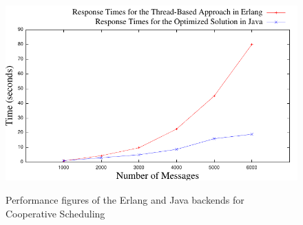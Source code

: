 \begin{figure}
	\caption{Performance figures of the Erlang and Java backends for Cooperative Scheduling}
	\centering
	\includegraphics[scale=0.8]{erlj8.pdf}
	\label{ej}
	
\end{figure}



